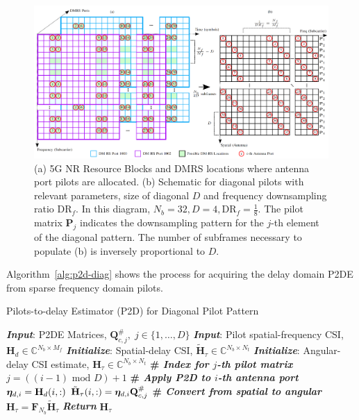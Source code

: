 \begin{figure}[!hbtp]
    \centering
    \includegraphics[width=\linewidth]{images/03_p2d_pilots_diag_with_resource_grid_5gnr_ortho.png}
    \caption{(a) 5G NR Resource Blocks and DMRS locations where antenna port pilots are allocated. (b) Schematic for diagonal pilots with relevant parameters, size of diagonal $D$ and frequency downsampling ratio $\text{DR}_f$. In this diagram, $N_b=32, D=4, \text{DR}_f=\frac 18$. The pilot matrix $\mathbf{P}_j$ indicates the downsampling pattern for the $j$-th element of the diagonal pattern. The number of subframes necessary to populate (b) is inversely proportional to $D$.}
    \label{fig:p2d_diag_5gnr}
\end{figure}

Algorithm~\ref{alg:p2d-diag} shows the process for acquiring the delay domain P2DE from sparse frequency domain pilots.

\begin{algorithm}
    \caption{Pilots-to-delay Estimator (P2D) for Diagonal Pilot Pattern} 
    \label{alg:p2d-diag}
    \begin{algorithmic}[1]
    \State \textbf{\emph{Input}}:
        P2DE Matrices, $\mathbf{Q}_{c,j}^\#,\;
        j\in\{1,\dots, D\}$
    \State \textbf{\emph{Input}}: Pilot spatial-frequency CSI, $\mathbf{H}_d\in\mathbb{C}^{N_b\times M_f}$
    \State \textbf{\emph{Initialize}}: Spatial-delay CSI, $\tilde{\mathbf{H}}_\tau\in\mathbb{C}^{N_b\times N_t}$
   \State \textbf{\emph{Initialize}}: Angular-delay CSI estimate, ${\mathbf{H}}_\tau
              \in\mathbb{C}^{N_b\times N_t}$
        \State \textbf{\# \emph{Index for $j$-th pilot matrix}}
        \State $j = ((i-1) \text{ mod } D) + 1$
        \State \textbf{\# \emph{Apply P2D to $i$-th antenna port}}
        \State ${\boldsymbol{\eta}}_{d,i} = \mathbf{H}_d(i,:)$
        \State $\tilde{{\mathbf{H}}}_{\tau}(i,:) = {\boldsymbol{\eta}}_{d,i}\mathbf{Q}^{\#}_{c,j}$
        \EndFor
        \State \textbf{\# \emph{Convert from spatial to angular}}
        \State ${{\mathbf{H}}}_{\tau}=\mathbf{F}_{N_b}\tilde{{\mathbf{H}}}_{\tau}$
        \State \textbf{\emph{Return}} ${{\mathbf{H}}}_{\tau}$
    \end{algorithmic} 
\end{algorithm}



